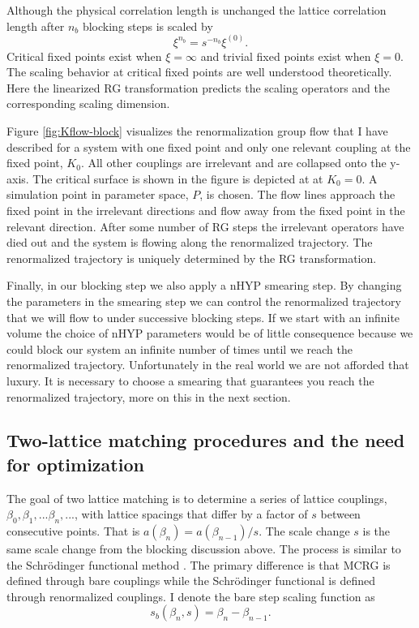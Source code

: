 Although the physical correlation length is unchanged the lattice correlation length after $n_b$ blocking steps is scaled by
\begin{equation}
  \label{eqn:xi}
  \xi^{n_b}=s^{-n_b}\xi^{(0)}.
\end{equation}
Critical fixed points exist when $\xi = \infty$ and trivial fixed points exist when $\xi = 0$.
The scaling behavior at critical fixed points are well understood theoretically.
Here the linearized RG transformation predicts the scaling operators and the corresponding scaling dimension.

Figure \ref{fig:Kflow-block} visualizes the renormalization group flow that I have described for a system with one fixed point and only one relevant coupling at the fixed point, $K_0$.
All other couplings are irrelevant and are collapsed onto the y-axis.
The critical surface is shown in the figure is depicted at at $K_0=0$.
A simulation point in parameter space, $P$, is chosen.
The flow lines approach the fixed point in the irrelevant directions and flow away from the fixed point in the relevant direction.
After some number of RG steps the irrelevant operators have died out and the system is flowing along the renormalized trajectory.
The renormalized trajectory is uniquely determined by the RG transformation.

Finally, in our blocking step we also apply a nHYP smearing step.
By changing the parameters in the smearing step we can control the renormalized trajectory that we will flow to under successive blocking steps.
If we start with an infinite volume the choice of nHYP parameters would be of little consequence because we could block our system an infinite number of times until we reach the renormalized trajectory.
Unfortunately in the real world we are not afforded that luxury.
It is necessary to choose a smearing that guarantees you reach the renormalized trajectory, more on this in the next section.

\subsection{Two-lattice matching procedures and the need for optimization} %
The goal of two lattice matching is to determine a series of lattice couplings, $\beta_0,\beta_1,...\beta_n,...$, with lattice spacings that differ by a factor of $s$ between consecutive points.
That is $a(\beta_n)=a(\beta_{n-1})/s$.
The scale change $s$ is the same scale change from the blocking discussion above.
The process is similar to the Schr\"odinger functional method \cite{Sint1994135,Bode1998796}.
The primary difference is that MCRG is defined through bare couplings while the Schr\"odinger functional is defined through renormalized couplings.
I denote the bare step scaling function as 
\begin{equation}
  s_b(\beta_n,s)=\beta_n-\beta_{n-1}.
\end{equation}

